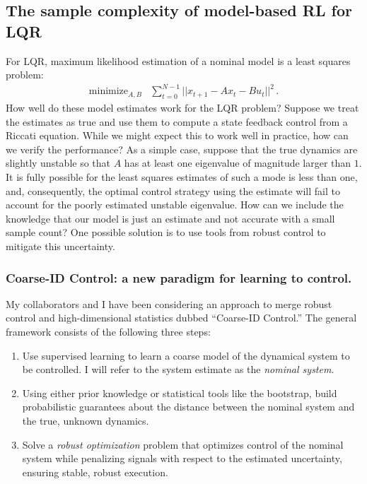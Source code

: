 \documentclass[11pt]{article}
\numberwithin{equation}{section}
\begin{document}
\subsection{The sample complexity of model-based RL for LQR}\label{sec:nominal}

For LQR, maximum likelihood estimation of a nominal model is a least squares problem:
$$
\begin{array}{ll}
\mbox{minimize}_{A,B} & \sum_{t=0}^{N-1} ||x_{t+1} - A x_t -  B u_t||^2\,.
\end{array}
$$
How well do these model estimates work for the LQR problem? Suppose we treat the estimates as true and use them to compute a state feedback control from a Riccati equation. While we might expect this to work well in practice, how can we verify the performance?  As a simple case, suppose that the true dynamics are slightly unstable so that $A$ has at least one eigenvalue of magnitude larger than $1$.  It is fully possible for the least squares estimates of such a mode is less than one, and, consequently, the optimal control strategy using the estimate will fail to account for the poorly estimated unstable eigenvalue. How can we include the knowledge that our model is just an estimate and not accurate with a small sample count? One possible solution is to use tools from robust control to mitigate this uncertainty.

\subsubsection{Coarse-ID Control: a new paradigm for learning to control.}

My collaborators and I have been considering an approach to merge robust control and high-dimensional statistics dubbed ``Coarse-ID Control.'' The general framework consists of the following three steps:  
\begin{enumerate}
\item Use supervised learning to learn a coarse model of the dynamical system to be controlled.  I will refer to the system estimate as the \emph{nominal system}.
\item Using either prior knowledge or statistical tools like the bootstrap, build probabilistic guarantees about the distance between the nominal system and the true, unknown dynamics.
\item Solve a \emph{robust optimization} problem that optimizes control of the nominal system while penalizing signals with respect to the estimated uncertainty, ensuring stable, robust execution.
\end{enumerate}
\end{document}
